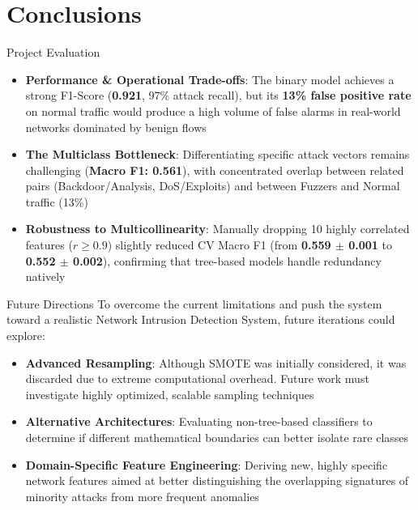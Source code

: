 \documentclass{beamer}
\begin{document}
\section{Conclusions}

\begin{frame}{Project Evaluation}
  \begin{itemize}
    \item \textbf{Performance \& Operational Trade-offs}: The binary model achieves a strong F1-Score (\textbf{0.921}, 97\% attack recall), but its \textbf{13\% false positive rate} on normal traffic would produce a high volume of false alarms in real-world networks dominated by benign flows
    \vspace{0.2cm}
    \item \textbf{The Multiclass Bottleneck}: Differentiating specific attack vectors remains challenging (\textbf{Macro F1: 0.561}), with concentrated overlap between related pairs (Backdoor/Analysis, DoS/Exploits) and between Fuzzers and Normal traffic (13\%)
    \vspace{0.2cm}
    \item \textbf{Robustness to Multicollinearity}: Manually dropping 10 highly correlated features ($r \ge 0.9$) slightly reduced CV Macro F1 (from \textbf{0.559 $\pm$ 0.001} to \textbf{0.552 $\pm$ 0.002}), confirming that tree-based models handle redundancy natively
  \end{itemize}
\end{frame}

\begin{frame}{Future Directions}
  To overcome the current limitations and push the system toward a realistic Network Intrusion Detection System, future iterations 
  could explore:
  
  \vspace{0.3cm}
  \begin{itemize}
    \item \textbf{Advanced Resampling}: Although SMOTE was initially considered, it was discarded due to extreme computational overhead. Future work must investigate highly optimized, scalable sampling techniques
    \vspace{0.2cm}
    \item \textbf{Alternative Architectures}: Evaluating non-tree-based classifiers to determine if different mathematical boundaries can better isolate rare classes
    \vspace{0.2cm}
    \item \textbf{Domain-Specific Feature Engineering}: Deriving new, highly specific network features aimed at better distinguishing the overlapping signatures of minority attacks from more frequent anomalies
  \end{itemize}
\end{frame}
\end{document}
